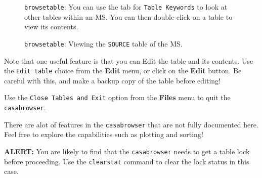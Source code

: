 \begin{figure}[h!]
\begin{center}
\caption{\label{fig:qcasabrowser2} {\tt browsetable}: You can use the
  tab for {\tt Table Keywords} to look at other tables within an MS.
  You can then double-click on a table to view its contents.} 
\hrulefill
\end{center}
\end{figure}
 
\begin{figure}[h!]
\begin{center}
\caption{\label{fig:qcasabrowser3} {\tt browsetable}: Viewing the 
{\tt SOURCE} table of the MS.}
\hrulefill
\end{center}
\end{figure}

Note that one useful feature is that you can Edit the table and its
contents.  Use the {\tt Edit table} choice from the {\bf Edit} menu,
or click on the {\bf Edit} button.  Be careful with this, and make
a backup copy of the table before editing!

Use the {\tt Close Tables and Exit} option from the {\bf Files} menu
to quit the {\tt casabrowser}.

There are alot of features in the {\tt casabrowser}
that are not fully documented here.  Feel free to explore the
capabilities such as plotting and sorting!

{\bf ALERT:} You are likely to find that the {\tt casabrowser}
needs to get a table lock before proceeding.  Use the {\tt clearstat}
command to clear the lock status in this case.



%

